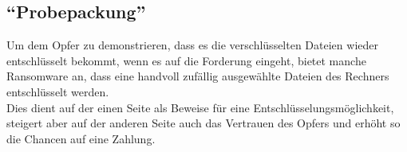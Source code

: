 

\subsection{"`Probepackung"'}

Um dem Opfer zu demonstrieren, dass es die verschlüsselten Dateien wieder entschlüsselt bekommt, wenn es auf die Forderung eingeht, bietet manche Ransomware an, dass eine handvoll zufällig ausgewählte Dateien des Rechners entschlüsselt werden. \\
Dies dient auf der einen Seite als Beweise für eine Entschlüsselungsmöglichkeit, steigert aber auf der anderen Seite auch das Vertrauen des Opfers und erhöht so die Chancen auf eine Zahlung.






